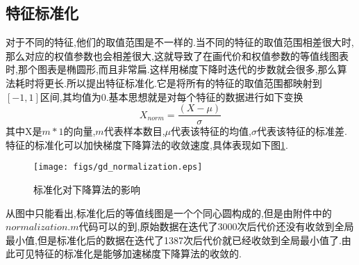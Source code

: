 \subsection{特征标准化}
对于不同的特征,他们的取值范围是不一样的.当不同的特征的取值范围相差很大时,那么对应的权值参数也会相差很大,这就导致了在画代价和权值参数的等值线图表时,那个图表是椭圆形,而且非常扁.这样用梯度下降时迭代的步数就会很多,那么算法耗时将更长.所以提出特征标准化.它是将所有的特征的取值范围都映射到$[-1,1]$区间,其均值为0.基本思想就是对每个特征的数据进行如下变换
\begin{equation}
X_{norm}=\frac{(X-\mu)}{\sigma}
\end{equation}
其中X是$m*1$的向量,$m$代表样本数目,$\mu$代表该特征的均值,$\sigma$代表该特征的标准差.特征的标准化可以加快梯度下降算法的收敛速度,具体表现如下图\ref{gd:figure:normalization}.
\begin{figure}[!htbp]
	\centering
	\texttt{[image: figs/gd\_normalization.eps]} 
	\caption{标准化对下降算法的影响}    
	\label{gd:figure:normalization}
\end{figure}


从图中只能看出,标准化后的等值线图是一个个同心圆构成的,但是由附件中的$normalization.m$代码可以的到,原始数据在迭代了3000次后代价还没有收敛到全局最小值,但是标准化后的数据在迭代了1387次后代价就已经收敛到全局最小值了.由此可见特征的标准化是能够加速梯度下降算法的收敛的.












